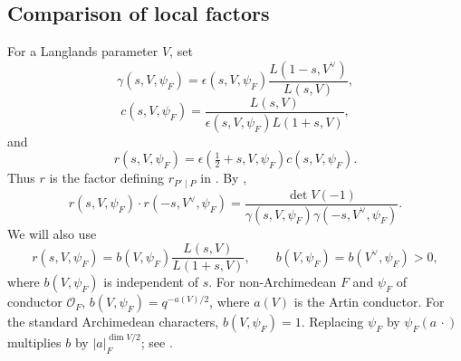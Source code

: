 \documentclass[11pt,reqno]{amsart}
\theoremstyle{plain}
\theoremstyle{definition}
\newcommand{\cO}{\mathcal{O}}
\numberwithin{equation}{subsection}
\begin{document}
\subsection{Comparison of local factors}
\label{akms-reg:sec:factors}
For a Langlands parameter $V$, set
\[
 \gamma(s,V,\psi_F)=\epsilon(s,V,\psi_F)
                    \frac{L(1-s,V^\vee)}{L(s,V)},
\]
\begin{equation}\label{akms-reg:eq:c}
 c(s,V,\psi_F)=\frac{L(s,V)}
 {\epsilon(s,V,\psi_F)L(1+s,V)},
\end{equation}
and
\begin{equation}\label{akms-reg:eq:k}
 r(s,V,\psi_F)=\epsilon(\tfrac12+s,V,\psi_F)c(s,V,\psi_F).
\end{equation}
Thus $r$ is the factor defining $r_{P'\mid P}$ in
\cite[\S2.2]{KMSW}. By \cite[(3.4.4), (3.4.7), (4.1.6)]{Tat79},
\begin{equation}\label{akms-reg:eq:opposite-k}
 r(s,V,\psi_F)\cdot r(-s,V^\vee,\psi_F)
 =\frac{\det V(-1)}
 {\gamma(s,V,\psi_F)\gamma(-s,V^\vee,\psi_F)}.
\end{equation}
We will also use
\begin{equation}\label{akms-reg:eq:k-positive}
 r(s,V,\psi_F)=b(V,\psi_F)\frac{L(s,V)}{L(1+s,V)},\qquad
 b(V,\psi_F)=b(V^\vee,\psi_F)>0,
\end{equation}
where $b(V,\psi_F)$ is independent of $s$.
For non-Archimedean $F$ and $\psi_F$ of conductor $\cO_F$,
$b(V,\psi_F)=q^{-a(V)/2}$, where $a(V)$ is the Artin conductor.
For the standard Archimedean characters, $b(V,\psi_F)=1$.
Replacing $\psi_F$ by $\psi_F(a\,\cdot)$ multiplies $b$ by
$|a|_F^{\dim V/2}$; see \cite[(3.4.4)--(3.4.7), (4.1.6)]{Tat79}.
\end{document}
